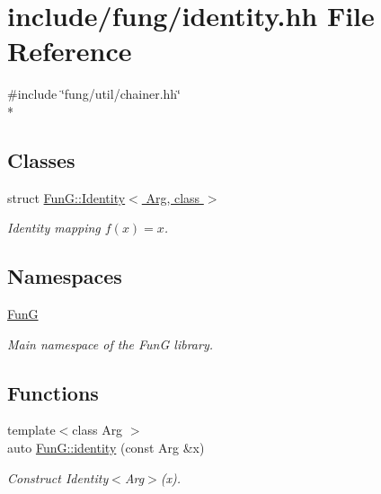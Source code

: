 \hypertarget{identity_8hh}{\section{include/fung/identity.hh File Reference}
\label{identity_8hh}
}
{\ttfamily \#include \char`\"{}fung/util/chainer.\-hh\char`\"{}}\\*
\subsection*{Classes}
\begin{DoxyCompactItemize}
\item 
struct \hyperlink{structFunG_1_1Identity}{Fun\-G\-::\-Identity$<$ Arg, class $>$}
\begin{DoxyCompactList}\small\item\em Identity mapping $ f(x)=x $. \end{DoxyCompactList}\end{DoxyCompactItemize}
\subsection*{Namespaces}
\begin{DoxyCompactItemize}
\item 
\hyperlink{namespaceFunG}{Fun\-G}
\begin{DoxyCompactList}\small\item\em Main namespace of the Fun\-G library. \end{DoxyCompactList}\end{DoxyCompactItemize}
\subsection*{Functions}
\begin{DoxyCompactItemize}
\item 
{\footnotesize template$<$class Arg $>$ }\\auto \hyperlink{namespaceFunG_a165e879e76d3a2a8906938f3658445ce}{Fun\-G\-::identity} (const Arg \&x)
\begin{DoxyCompactList}\small\item\em Construct Identity$<$\-Arg$>$(x). \end{DoxyCompactList}\end{DoxyCompactItemize}
